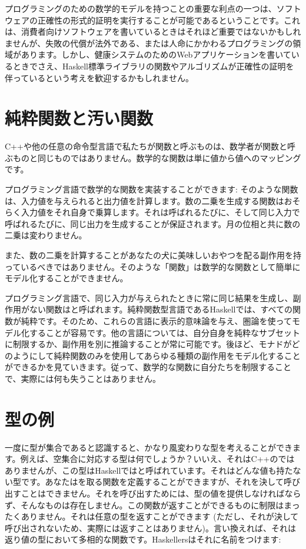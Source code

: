 プログラミングのための数学的モデルを持つことの重要な利点の一つは、ソフトウェアの正確性の形式的証明を実行することが可能であるということです。これは、消費者向けソフトウェアを書いているときはそれほど重要ではないかもしれませんが、失敗の代償が法外である、または人命にかかわるプログラミングの領域があります。しかし、健康システムのためのWebアプリケーションを書いているときでさえ、Haskell標準ライブラリの関数やアルゴリズムが正確性の証明を伴っているという考えを歓迎するかもしれません。

\section{純粋関数と汚い関数}

C++や他の任意の命令型言語で私たちが関数と呼ぶものは、数学者が関数と呼ぶものと同じものではありません。数学的な関数は単に値から値へのマッピングです。

プログラミング言語で数学的な関数を実装することができます: そのような関数は、入力値を与えられると出力値を計算します。数の二乗を生成する関数はおそらく入力値をそれ自身で乗算します。それは呼ばれるたびに、そして同じ入力で呼ばれるたびに、同じ出力を生成することが保証されます。月の位相と共に数の二乗は変わりません。

また、数の二乗を計算することがあなたの犬に美味しいおやつを配る副作用を持っているべきではありません。そのような「関数」は数学的な関数として簡単にモデル化することができません。

プログラミング言語で、同じ入力が与えられたときに常に同じ結果を生成し、副作用がない関数はと呼ばれます。純粋関数型言語であるHaskellでは、すべての関数が純粋です。そのため、これらの言語に表示的意味論を与え、圏論を使ってモデル化することが容易です。他の言語については、自分自身を純粋なサブセットに制限するか、副作用を別に推論することが常に可能です。後ほど、モナドがどのようにして純粋関数のみを使用してあらゆる種類の副作用をモデル化することができるかを見ていきます。従って、数学的な関数に自分たちを制限することで、実際には何も失うことはありません。

\section{型の例}

一度に型が集合であると認識すると、かなり風変わりな型を考えることができます。例えば、空集合に対応する型は何でしょうか？いいえ、それはC++のではありませんが、この型はHaskellではと呼ばれています。それはどんな値も持たない型です。あなたはを取る関数を定義することができますが、それを決して呼び出すことはできません。それを呼び出すためには、型の値を提供しなければならず、そんなものは存在しません。この関数が返すことができるものに制限はまったくありません。それは任意の型を返すことができます (ただし、それが決して呼び出されないため、実際には返すことはありません)。言い換えれば、それは返り値の型において多相的な関数です。Haskellersはそれに名前をつけます: 

